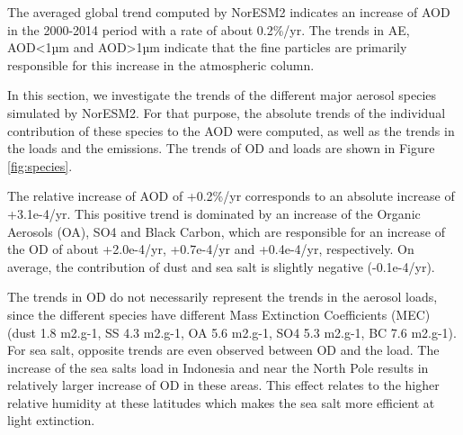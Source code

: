 \documentclass[journal abbreviation, manuscript]{copernicus}
\begin{document}
The averaged global trend computed by NorESM2 indicates an increase of AOD in the 2000-2014 period with a rate of about 0.2\%/yr. The trends in AE, AOD<1µm and AOD>1µm indicate that the fine particles are primarily responsible for this increase in the atmospheric column.

In this section, we investigate the trends of the different major aerosol species simulated by NorESM2. For that purpose, the absolute trends of the individual contribution of these species to the AOD were computed, as well as the trends in the loads and the emissions. The trends of OD and loads are shown in Figure \ref{fig:species}.

The relative increase of AOD of +0.2\%/yr corresponds to an absolute increase of +3.1e-4/yr. This positive trend is dominated by an increase of the Organic Aerosols (OA), SO4 and Black Carbon, which are responsible for an increase of the OD of about +2.0e-4/yr, +0.7e-4/yr and +0.4e-4/yr, respectively. On average, the contribution of dust and sea salt is slightly negative (-0.1e-4/yr).

The trends in OD do not necessarily represent the trends in the aerosol loads, since the different species have different Mass Extinction Coefficients (MEC) (dust 1.8 m2.g-1, SS 4.3 m2.g-1, OA 5.6 m2.g-1, SO4 5.3 m2.g-1, BC 7.6 m2.g-1). For sea salt, opposite trends are even observed between OD and the load. The increase of the sea salts load in Indonesia and near the North Pole results in relatively larger increase of OD in these areas. This effect relates to the higher relative humidity at these latitudes which makes the sea salt more efficient at light extinction.


\conclusions  %
\end{document}
